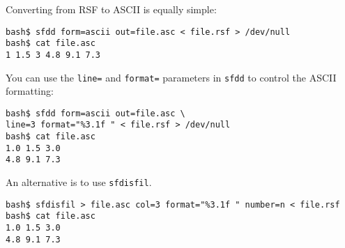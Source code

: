 Converting from RSF to ASCII is equally simple:
\begin{verbatim}
bash$ sfdd form=ascii out=file.asc < file.rsf > /dev/null
bash$ cat file.asc
1 1.5 3 4.8 9.1 7.3
\end{verbatim}
You can use the \texttt{line=} and \texttt{format=} parameters in
\texttt{sfdd} to control the ASCII formatting:
\begin{verbatim}
bash$ sfdd form=ascii out=file.asc \
line=3 format="%3.1f " < file.rsf > /dev/null
bash$ cat file.asc
1.0 1.5 3.0
4.8 9.1 7.3
\end{verbatim}
An alternative is to use \texttt{sfdisfil}.
\begin{verbatim}
bash$ sfdisfil > file.asc col=3 format="%3.1f " number=n < file.rsf
bash$ cat file.asc
1.0 1.5 3.0
4.8 9.1 7.3
\end{verbatim}



